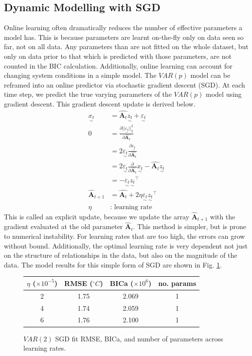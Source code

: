 \documentclass[12pt,a4paper]{article} %
\newcommand{\ve}[1]{\underset{\sim}{#1}}
\begin{document}
\subsection{Dynamic Modelling with SGD}
Online learning often dramatically reduces the number of effective parameters a model has. This is because parameters are learnt on-the-fly only on data seen so far, not on all data. Any parameters than are not fitted on the whole dataset, but only on data prior to that which is predicted with those parameters, are not counted in the BIC calculation. Additionally, online learning can account for changing system conditions in a simple model. The $VAR(p)$ model can be reframed into an online predictor via stochastic gradient descent (SGD). At each time step, we predict the true varying parameters of the $VAR(p)$ model using gradient descent. This gradient descent update is derived below.
\begin{align*}
    \ve{x_t}&=\hat{\pmb{A}_t}\ve{z_t}+\ve{\varepsilon_t}\\
    0&=\frac{\partial||\ve{\varepsilon_t}||_2^2}{\partial\hat{\pmb{A}_t}}\\
    &=2\ve{\varepsilon_t}\frac{\partial\ve{\varepsilon_t}}{\partial\hat{\pmb{A}_t}}\\
    &=2\ve{\varepsilon_t}\frac{\partial}{\partial\hat{\pmb{A}_t}}\ve{x_t}-\hat{\pmb{A}_t}\ve{z_t}\\
    &=-\ve{\varepsilon_t}\ve{z_t}^\top\\
    \hat{\pmb{A}}_{t+1}&=\hat{\pmb{A}_t}+2\eta\ve{\varepsilon_t}\ve{z_t}^\top\\
    \eta&:\text{ learning rate}
\end{align*}
This is called an explicit update, because we update the array $\hat{\pmb{A}}_{t+1}$ with the gradient evaluated at the old parameter $\hat{\pmb{A}}_t$. This method is simpler, but is prone to numerical instability. For learning rates that are too high, the errors can grow without bound. Additionally, the optimal learning rate is very dependent not just on the structure of relationships in the data, but also on the magnitude of the data. The model results for this simple form of SGD are shown in Fig. \ref{fig:sgd_table}.
\begin{figure}[!ht]
    \centering
    \begin{tabular}{|c|c|c|c|}
        \hline
        $\eta$ ($\times10^{-5}$) & RMSE ($^\circ C$) & BICa ($\times10^6$) & no. params \\
        \hline
        2 & 1.75 & 2.069 & 1 \\
        \hline
        4 & 1.74 & 2.059 & 1 \\
        \hline
        6 & 1.76 & 2.100 & 1 \\
        \hline
    \end{tabular}
    \caption{$VAR(2)$ SGD fit RMSE, BICa, and number of parameters across learning rates.}
    \label{fig:sgd_table}
\end{figure}
\end{document}
